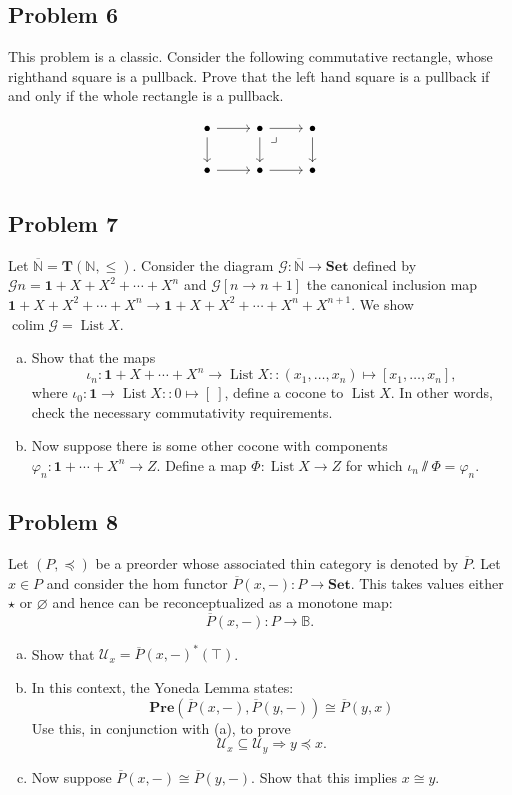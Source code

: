 \documentclass{amsart}
\theoremstyle{remark}
\theoremstyle{definition}
\theoremstyle{definition}
\DeclareMathOperator{\List}{List}
\DeclareMathOperator{\colim}{colim}
\newcommand{\ol}[1]{\overline{#1}}
\def\then{\sslash}
\def\Set{\mathbf{Set}}
\def\Pre{\mathbf{Pre}}
\def\BB{\mathbb B}
\def\NN{\mathbb N}
\begin{document}
\subsection{Problem 6}
This problem is a classic. Consider the following commutative rectangle, whose righthand square is a pullback. Prove that the left hand square is a pullback if and only if the whole rectangle is a pullback.

\[
\begin{tikzcd}
\bullet \arrow[r] \arrow[d] & \bullet  \arrow[dr, phantom, "\lrcorner", very near start]  \arrow[r] \arrow[d] & \bullet \arrow[d] \\
\bullet \arrow[r] & \bullet  \arrow[r] & \bullet
\end{tikzcd}
\]

\subsection{Problem 7}

Let $\ol{\NN}=\mathbf{T}(\NN,\leq)$. Consider the diagram $\mathcal{G}:\ol{\NN}\to\Set$ defined by $\mathcal{G}n=\mathbf{1}+X+X^2+\cdots+X^n$ and $\mathcal{G}[n\to n+1]$ the canonical inclusion map $\mathbf{1}+X+X^2+\cdots+X^n\to \mathbf{1}+X+X^2+\cdots+X^n+X^{n+1}$. We show $\colim\mathcal{G}=\List X$.
\begin{enumerate}[(a)]
    \item Show that the maps \[\iota_n:\mathbf{1}+X+\cdots+X^n\to\List X::(x_1,\dots,x_n)\mapsto[x_1,\dots,x_n],\]
    where $\iota_0:\mathbf{1}\to\List X::0\mapsto [\:]$, define a cocone to $\List X$. In other words, check the necessary commutativity requirements.
    \item Now suppose there is some other cocone with components $\varphi_n:\mathbf{1}+\cdots+X^n\to Z$. Define a map $\Phi:\List X\to Z$ for which $\iota_n\then\Phi = \varphi_n$. 
\end{enumerate}


\subsection{Problem 8}

Let $(P,\preceq)$ be a preorder whose associated thin category is denoted by $\ol{P}$. Let $x\in P$ and consider the hom functor $\ol{P}(x,-):P\to\Set$. This takes values either $\star$ or $\varnothing$ and hence can be reconceptualized as a monotone map:
\[\ol{P}(x,-):P\to\BB.\]
\begin{enumerate}[(a)]
    \item Show that $\mathcal{U}_x=\ol{P}(x,-)^*(\top)$.
    \item In this context, the Yoneda Lemma states:
    \[\Pre(\ol{P}(x,-),\ol{P}(y,-))\cong\ol{P}(y,x)\]
    Use this, in conjunction with (a), to prove
    \[\mathcal{U}_x\subseteq\mathcal{U}_y \Rightarrow y\preceq x.\]
    \item Now suppose $\ol{P}(x,-)\cong\ol{P}(y,-)$. Show that this implies $x\cong y$.
\end{enumerate}
\end{document}

